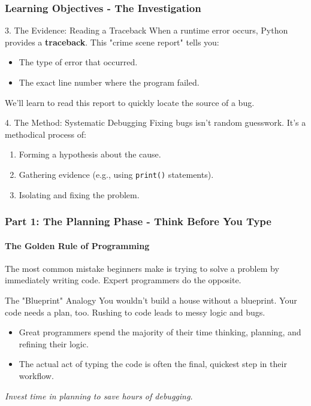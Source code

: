 \documentclass{beamer}
\begin{document}
\begin{frame}[fragile]
    \frametitle{Learning Objectives - The Investigation}
    
    \begin{block}{3. The Evidence: Reading a Traceback}
        When a runtime error occurs, Python provides a \textbf{traceback}. This "crime scene report" tells you:
        \begin{itemize}
            \item The type of error that occurred.
            \item The exact line number where the program failed.
        \end{itemize}
        We'll learn to read this report to quickly locate the source of a bug.
    \end{block}
    
    \vspace{1em}
    
    \begin{block}{4. The Method: Systematic Debugging}
        Fixing bugs isn't random guesswork. It's a methodical process of:
        \begin{enumerate}
            \item Forming a hypothesis about the cause.
            \item Gathering evidence (e.g., using \texttt{print()} statements).
            \item Isolating and fixing the problem.
        \end{enumerate}
    \end{block}
\end{frame}

\begin{frame}[fragile]
    \frametitle{Part 1: The Planning Phase - Think Before You Type}
    \framesubtitle{The Golden Rule of Programming}

    The most common mistake beginners make is trying to solve a problem by immediately writing code. Expert programmers do the opposite.

    \begin{block}{The "Blueprint" Analogy}
        You wouldn't build a house without a blueprint. Your code needs a plan, too. Rushing to code leads to messy logic and bugs.
    \end{block}

    \begin{itemize}
        \item Great programmers spend the majority of their time thinking, planning, and refining their logic.
        \item The actual act of typing the code is often the final, quickest step in their workflow.
    \end{itemize}

    \vspace*{\fill}
    \begin{center}
        \textit{Invest time in planning to save hours of debugging.}
    \end{center}
\end{frame}
\end{document}
